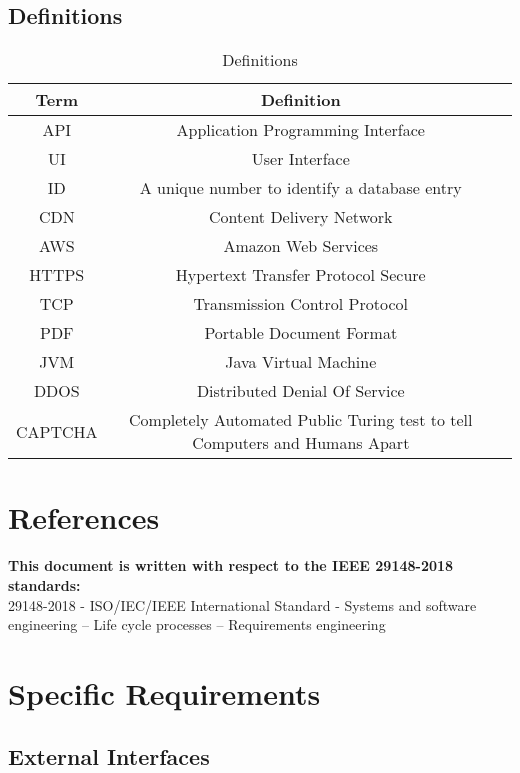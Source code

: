 \documentclass[listof=nochaptergap]{report}
\begin{document}
\section{Definitions}
    \begin{table}[ht]
        \centering
         \begin{tabular}{| c | c | c |} 
         \hline
         \textbf{Term} & \textbf{Definition} \\
         \hline
         API & Application Programming Interface \\
         \hline
         UI & User Interface \\
         \hline
         ID & A unique number to identify a database entry \\
         \hline
         CDN & Content Delivery Network \\
         \hline
         AWS & Amazon Web Services \\
         \hline
         HTTPS & Hypertext Transfer Protocol Secure \\
         \hline
         TCP & Transmission Control Protocol \\
         \hline
         PDF & Portable Document Format \\ 
         \hline
         JVM & Java Virtual Machine \\
         \hline
         DDOS & Distributed Denial Of Service \\
         \hline
         CAPTCHA & Completely Automated Public Turing test to tell Computers and Humans Apart \\
         \hline
         \end{tabular}
        \caption{Definitions}
        \label{tab:table2}
    \end{table}
\chapter{References}
\textbf{This document is written with respect to the IEEE 29148-2018 standards:} \\


29148-2018 - ISO/IEC/IEEE International Standard - Systems and software engineering – Life cycle processes – Requirements engineering \\


\chapter{Specific Requirements}
\section{External Interfaces}
\end{document}
